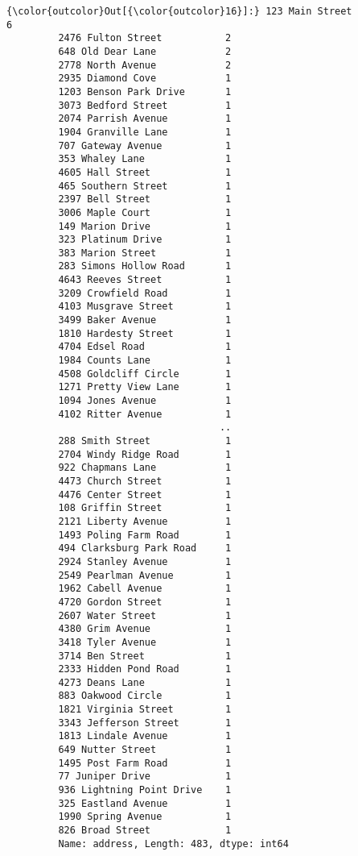\documentclass[11pt]{article}
\begin{document}
\begin{Verbatim}[commandchars=\\\{\}]
{\color{outcolor}Out[{\color{outcolor}16}]:} 123 Main Street              6
         2476 Fulton Street           2
         648 Old Dear Lane            2
         2778 North Avenue            2
         2935 Diamond Cove            1
         1203 Benson Park Drive       1
         3073 Bedford Street          1
         2074 Parrish Avenue          1
         1904 Granville Lane          1
         707 Gateway Avenue           1
         353 Whaley Lane              1
         4605 Hall Street             1
         465 Southern Street          1
         2397 Bell Street             1
         3006 Maple Court             1
         149 Marion Drive             1
         323 Platinum Drive           1
         383 Marion Street            1
         283 Simons Hollow Road       1
         4643 Reeves Street           1
         3209 Crowfield Road          1
         4103 Musgrave Street         1
         3499 Baker Avenue            1
         1810 Hardesty Street         1
         4704 Edsel Road              1
         1984 Counts Lane             1
         4508 Goldcliff Circle        1
         1271 Pretty View Lane        1
         1094 Jones Avenue            1
         4102 Ritter Avenue           1
                                     ..
         288 Smith Street             1
         2704 Windy Ridge Road        1
         922 Chapmans Lane            1
         4473 Church Street           1
         4476 Center Street           1
         108 Griffin Street           1
         2121 Liberty Avenue          1
         1493 Poling Farm Road        1
         494 Clarksburg Park Road     1
         2924 Stanley Avenue          1
         2549 Pearlman Avenue         1
         1962 Cabell Avenue           1
         4720 Gordon Street           1
         2607 Water Street            1
         4380 Grim Avenue             1
         3418 Tyler Avenue            1
         3714 Ben Street              1
         2333 Hidden Pond Road        1
         4273 Deans Lane              1
         883 Oakwood Circle           1
         1821 Virginia Street         1
         3343 Jefferson Street        1
         1813 Lindale Avenue          1
         649 Nutter Street            1
         1495 Post Farm Road          1
         77 Juniper Drive             1
         936 Lightning Point Drive    1
         325 Eastland Avenue          1
         1990 Spring Avenue           1
         826 Broad Street             1
         Name: address, Length: 483, dtype: int64
\end{Verbatim}
            
\end{document}
